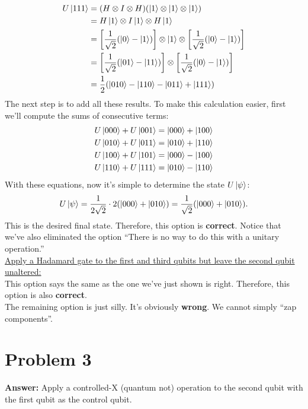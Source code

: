 \documentclass[11pt]{article}
\newcommand{\invroot}[1]{\frac{1}{\sqrt{#1}}}
\begin{document}
\begin{align}
  \begin{split}
    U\ket{111}&=(H\otimes I\otimes H)(\ket{1}\otimes\ket{1}\otimes\ket{1})\\
    &=H\ket{1}\otimes I\ket{1}\otimes H\ket{1}\\
    &=\left[\invroot{2}(\ket{0}-\ket{1})\right]\otimes\ket{1}\otimes\left[\invroot{2}(\ket{0}-\ket{1})\right]\\
    &=\left[\invroot{2}(\ket{01}-\ket{11})\right]\otimes\left[\invroot{2}(\ket{0}-\ket{1})\right]\\
    &=\frac{1}{2}(\ket{010}-\ket{110}-\ket{011}+\ket{111})
  \end{split}
\end{align}
The next step is to add all these results. To make this calculation easier,
first we'll compute the sums of consecutive terms:
\begin{align}
  \begin{split}
    U\ket{000}+U\ket{001}&=\ket{000}+\ket{100}\\
    U\ket{010}+U\ket{011}&=\ket{010}+\ket{110}\\
    U\ket{100}+U\ket{101}&=\ket{000}-\ket{100}\\
    U\ket{110}+U\ket{111}&=\ket{010}-\ket{110}
  \end{split}
\end{align}
With these equations, now it's simple to determine the state \(U\ket{\psi}\):
\begin{equation}
U\ket{\psi}=\frac{1}{2\sqrt{2}}\cdot 2(\ket{000}+\ket{010})=\invroot{2}(\ket{000}+\ket{010}).
\end{equation}
This is the desired final state. Therefore, this option is \textbf{correct}. Notice
that we've also eliminated the option ``There is no way to do this with a unitary
operation.''\\

\uline{Apply a Hadamard gate to the first and third qubits but leave the second qubit
unaltered:}\\
This option says the same as the one we've just shown is right. Therefore, this
option is also \textbf{correct}.\\

The remaining option is just silly. It's obviously \textbf{wrong}. We cannot simply
``zap components''.
\section*{Problem 3}
\label{sec:org8c4aac0}
\textbf{Answer:} Apply a controlled-X (quantum not) operation to the second qubit with
the first qubit as the control qubit.\\
\end{document}
